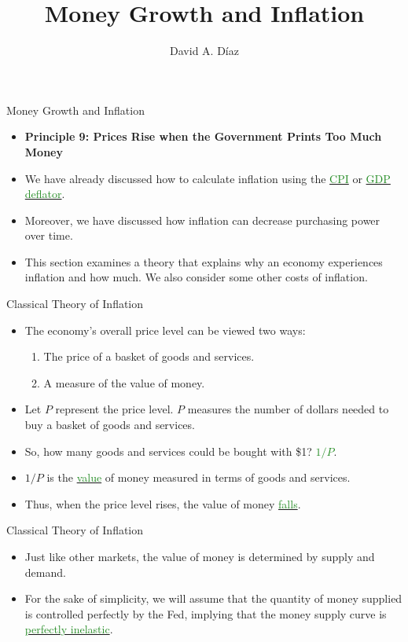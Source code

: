 \documentclass[xcolor={dvipsnames},pdf, hyperref={colorlinks=true, citecolor=ForestGreen, linkcolor=BlueViolet, urlcolor=Magenta}]{beamer}
\title{Money Growth and Inflation}
\author{David A. D\'iaz}
\institute{UNC Chapel Hill}
\date{}
\theoremstyle{definition}
\newcommand{\dd}[1]{{\underline{\textcolor{ForestGreen}{#1}}}}
\begin{document}
 
	
	\begin{frame}
		
		\titlepage
		
	\end{frame}

\begin{frame}{Money Growth and Inflation}
\begin{itemize}
	\item \textbf{Principle 9: Prices Rise when the Government Prints Too Much Money}
	\item We have already discussed how to calculate inflation using the \dd{CPI} or \dd{GDP deflator}. 
	\item Moreover, we have discussed how inflation can decrease purchasing power over time.
	\item This section examines a theory that explains why an economy experiences inflation and how much. We also consider some other costs of inflation.
\end{itemize}
\end{frame}

\begin{frame}{Classical Theory of Inflation}
\begin{itemize}
	\item The economy's overall price level can be viewed two ways:
	
	\begin{enumerate}
		\item The price of a basket of goods and services.
		\item A measure of the value of money.
	\end{enumerate}
	
	\item Let $P$ represent the price level. $P$ measures the number of dollars needed to buy a basket of goods and services.
	\item So, how many goods and services could be bought with \$1? \dd{$1/P$}.
	\item $1/P$ is the \dd{value} of money measured in terms of goods and services.
	\item Thus, when the price level rises, the value of money \dd{falls}.
\end{itemize}
\end{frame}

\begin{frame}{Classical Theory of Inflation}
	\begin{itemize}
		\item Just like other markets, the value of money is determined by supply and demand.
		\item For the sake of simplicity, we will assume that the quantity of money supplied is controlled perfectly by the Fed, implying that the money supply curve is \dd{perfectly inelastic}.
	
	\end{itemize}
\end{frame}
\end{document}
